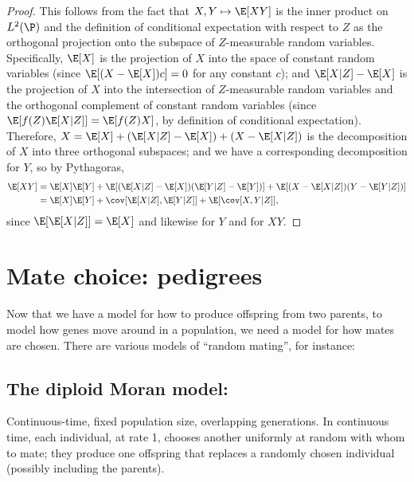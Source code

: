 \begin{proof}
This follows from the fact that $X,Y \mapsto \E[XY]$ is the inner product on $L^2(\P)$
and the definition of conditional expectation with respect to $Z$ as the orthogonal projection
onto the subspace of $Z$-measurable random variables.
Specifically, $\E[X]$ is the projection of $X$ into the space of constant random variables (since $\E[ (X-\E[X]) c ] = 0$ for any constant $c$);
and $\E[X|Z]-\E[X]$ is the projection of $X$ into the intersection of $Z$-measurable random variables and the orthogonal complement of constant random variables
(since $\E[ f(Z) \E[X|Z] ] = \E[ f(Z) X ]$, by definition of conditional expectation).
Therefore, $X = \E[X] + ( \E[X|Z] - \E[X] ) + ( X - \E[X|Z] )$
is the decomposition of $X$ into three orthogonal subspaces;
and we have a corresponding decomposition for $Y$,
so by Pythagoras,
\begin{align}
  \E[XY] &= \E[X]\E[Y] + \E[ (\E[X|Z] - \E[X])(\E[Y|Z] - \E[Y]) ] + \E[ (X - \E[X|Z])(Y - \E[Y|Z]) ]  \\
  &= \E[X]\E[Y] + \cov[ \E[X|Z], \E[Y|Z] ] + \E[ \cov[X,Y|Z] ] ,
\end{align}
since $\E[\E[X|Z]] = \E[X]$ and likewise for $Y$ and for $XY$.
\end{proof}






\section{Mate choice: pedigrees}

Now that we have a model for how to produce offspring from two parents,
to model how genes move around in a population,
we need a model for how mates are chosen.
There are various models of ``random mating'',
for instance:

\subsection{The diploid Moran model:}
Continuous-time, fixed population size, overlapping generations.
In continuous time, each individual, at rate 1, chooses another uniformly at random
with whom to mate;
they produce one offspring
that replaces a randomly chosen individual (possibly including the parents).


